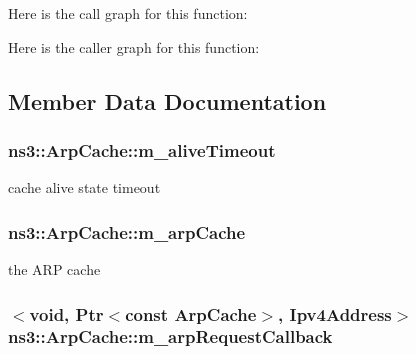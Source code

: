 Here is the call graph for this function\+:




Here is the caller graph for this function\+:




\subsection{Member Data Documentation}
\subsubsection[{\texorpdfstring{m\+\_\+alive\+Timeout}{m_aliveTimeout}}]{ ns3\+::\+Arp\+Cache\+::m\+\_\+alive\+Timeout\hspace{0.3cm}{\ttfamily [private]}}\hypertarget{classns3_1_1ArpCache_a30dc0bd7f1b0fb5847a9df0db1d52add}{}\label{classns3_1_1ArpCache_a30dc0bd7f1b0fb5847a9df0db1d52add}


cache alive state timeout 

\subsubsection[{\texorpdfstring{m\+\_\+arp\+Cache}{m_arpCache}}]{ ns3\+::\+Arp\+Cache\+::m\+\_\+arp\+Cache\hspace{0.3cm}{\ttfamily [private]}}\hypertarget{classns3_1_1ArpCache_a952de05903ff6b400c332c1bad8e0fc6}{}\label{classns3_1_1ArpCache_a952de05903ff6b400c332c1bad8e0fc6}


the A\+RP cache 

\subsubsection[{\texorpdfstring{m\+\_\+arp\+Request\+Callback}{m_arpRequestCallback}}]{$<$void, {\bf Ptr}$<$const {\bf Arp\+Cache}$>$, {\bf Ipv4\+Address}$>$ ns3\+::\+Arp\+Cache\+::m\+\_\+arp\+Request\+Callback\hspace{0.3cm}{\ttfamily [private]}}\hypertarget{classns3_1_1ArpCache_a91797ea0de773ea3b9ba84e8cd42a3e0}{}\label{classns3_1_1ArpCache_a91797ea0de773ea3b9ba84e8cd42a3e0}


